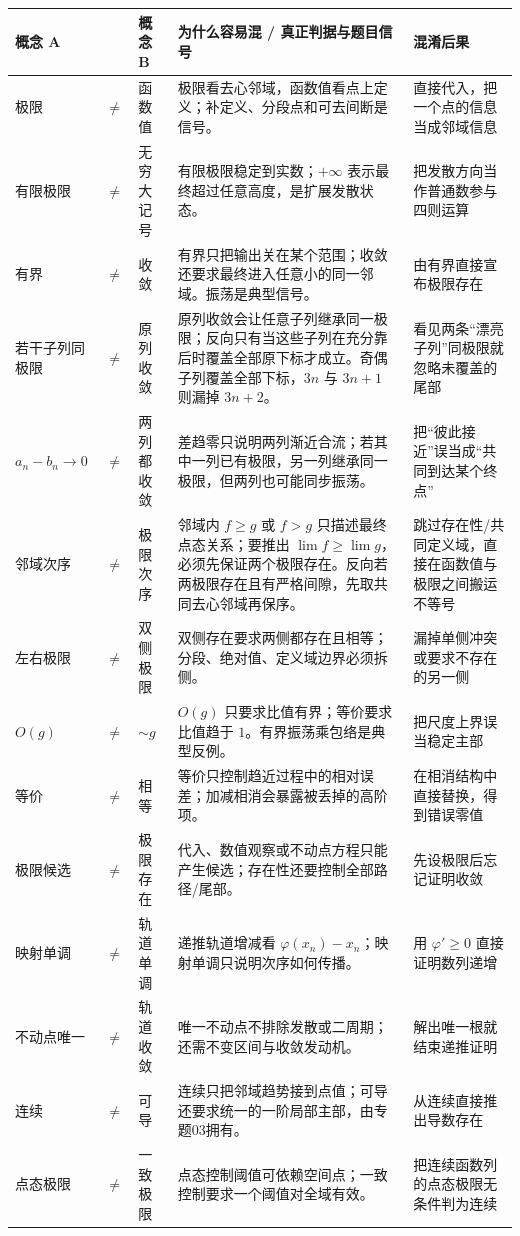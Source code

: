 \documentclass[11pt,a4paper]{ctexart}
\begin{document}
\noindent
\begin{tabularx}{\linewidth}{L{2.1cm}>{\centering\arraybackslash}p{0.45cm}L{2.1cm}L{5.8cm}Y}
\toprule
\textbf{概念 A} & & \textbf{概念 B} & \textbf{为什么容易混 / 真正判据与题目信号} & \textbf{混淆后果}\\
\midrule
极限 & $\neq$ & 函数值 & 极限看去心邻域，函数值看点上定义；补定义、分段点和可去间断是信号。 & 直接代入，把一个点的信息当成邻域信息\\
有限极限 & $\neq$ & 无穷大记号 & 有限极限稳定到实数；$+\infty$ 表示最终超过任意高度，是扩展发散状态。 & 把发散方向当作普通数参与四则运算\\
有界 & $\neq$ & 收敛 & 有界只把输出关在某个范围；收敛还要求最终进入任意小的同一邻域。振荡是典型信号。 & 由有界直接宣布极限存在\\
若干子列同极限 & $\neq$ & 原列收敛 & 原列收敛会让任意子列继承同一极限；反向只有当这些子列在充分靠后时覆盖全部原下标才成立。奇偶子列覆盖全部下标，$3n$ 与 $3n+1$ 则漏掉 $3n+2$。 & 看见两条“漂亮子列”同极限就忽略未覆盖的尾部\\
$a_n-b_n\to0$ & $\neq$ & 两列都收敛 & 差趋零只说明两列渐近合流；若其中一列已有极限，另一列继承同一极限，但两列也可能同步振荡。 & 把“彼此接近”误当成“共同到达某个终点”\\
邻域次序 & $\neq$ & 极限次序 & 邻域内 $f\ge g$ 或 $f>g$ 只描述最终点态关系；要推出 $\lim f\ge\lim g$，必须先保证两个极限存在。反向若两极限存在且有严格间隙，先取共同去心邻域再保序。 & 跳过存在性/共同定义域，直接在函数值与极限之间搬运不等号\\
左右极限 & $\neq$ & 双侧极限 & 双侧存在要求两侧都存在且相等；分段、绝对值、定义域边界必须拆侧。 & 漏掉单侧冲突或要求不存在的另一侧\\
$O(g)$ & $\neq$ & $\sim g$ & $O(g)$ 只要求比值有界；等价要求比值趋于 $1$。有界振荡乘包络是典型反例。 & 把尺度上界误当稳定主部\\
等价 & $\neq$ & 相等 & 等价只控制趋近过程中的相对误差；加减相消会暴露被丢掉的高阶项。 & 在相消结构中直接替换，得到错误零值\\
极限候选 & $\neq$ & 极限存在 & 代入、数值观察或不动点方程只能产生候选；存在性还要控制全部路径/尾部。 & 先设极限后忘记证明收敛\\
映射单调 & $\neq$ & 轨道单调 & 递推轨道增减看 $\varphi(x_n)-x_n$；映射单调只说明次序如何传播。 & 用 $\varphi'\ge0$ 直接证明数列递增\\
不动点唯一 & $\neq$ & 轨道收敛 & 唯一不动点不排除发散或二周期；还需不变区间与收敛发动机。 & 解出唯一根就结束递推证明\\
连续 & $\neq$ & 可导 & 连续只把邻域趋势接到点值；可导还要求统一的一阶局部主部，由专题03拥有。 & 从连续直接推出导数存在\\
点态极限 & $\neq$ & 一致极限 & 点态控制阈值可依赖空间点；一致控制要求一个阈值对全域有效。 & 把连续函数列的点态极限无条件判为连续\\
\bottomrule
\end{tabularx}
\end{document}
